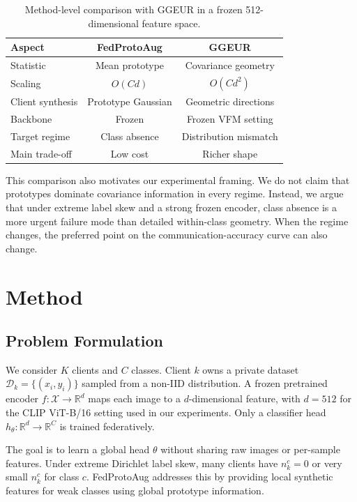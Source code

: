 ﻿\documentclass[conference]{IEEEtran}
\newcommand{\method}{FedProtoAug}
\newcommand{\clip}{CLIP}
\newcommand{\R}{\mathbb{R}}
\begin{document}
\begin{table}[t]
\centering
\caption{Method-level comparison with GGEUR in a frozen 512-dimensional feature space.}
\label{tab:method_compare}
\begin{tabular}{lcc}
\toprule
Aspect & \method{} & GGEUR \\
\midrule
Statistic & Mean prototype & Covariance geometry \\
Scaling & $O(Cd)$ & $O(Cd^2)$ \\
Client synthesis & Prototype Gaussian & Geometric directions \\
Backbone & Frozen & Frozen VFM setting \\
Target regime & Class absence & Distribution mismatch \\
Main trade-off & Low cost & Richer shape \\
\bottomrule
\end{tabular}
\end{table}

This comparison also motivates our experimental framing. We do not claim that prototypes dominate covariance information in every regime. Instead, we argue that under extreme label skew and a strong frozen encoder, class absence is a more urgent failure mode than detailed within-class geometry. When the regime changes, the preferred point on the communication-accuracy curve can also change.

\section{Method}

\subsection{Problem Formulation}
We consider $K$ clients and $C$ classes. Client $k$ owns a private dataset $\mathcal{D}_k=\{(x_i,y_i)\}$ sampled from a non-IID distribution. A frozen pretrained encoder $f:\mathcal{X}\rightarrow\R^d$ maps each image to a $d$-dimensional feature, with $d=512$ for the \clip{} ViT-B/16 setting used in our experiments. Only a classifier head $h_\theta:\R^d\rightarrow\R^C$ is trained federatively.

The goal is to learn a global head $\theta$ without sharing raw images or per-sample features. Under extreme Dirichlet label skew, many clients have $n_{k}^{c}=0$ or very small $n_{k}^{c}$ for class $c$. \method{} addresses this by providing local synthetic features for weak classes using global prototype information.
\end{document}
